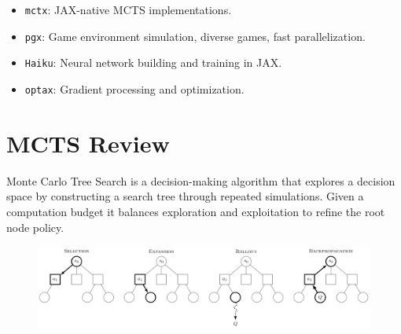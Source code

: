 \documentclass[aspectratio=169,xcolor=dvipsnames]{beamer}
\begin{document}

\begin{frame}{}
\begin{itemize}
    \item \texttt{mctx}: JAX-native MCTS implementations.
    \item \texttt{pgx}: Game environment simulation, diverse games, fast parallelization.
    \item \texttt{Haiku}: Neural network building and training in JAX.
    \item \texttt{optax}: Gradient processing and optimization.
\end{itemize}
\end{frame}

\section{MCTS Review}


\begin{frame}{}
\vspace{1.5em}
Monte Carlo Tree Search is a decision-making algorithm that explores a decision space by constructing a search tree through repeated simulations. Given a computation budget it balances exploration and exploitation to refine the root node policy.

\vspace{2.5em}

\begin{figure}[h]
    \centering
    \includegraphics[width=1.0\textwidth]{mcts.png}
    \label{fig:intro}
\end{figure}
\end{frame}
\end{document}
